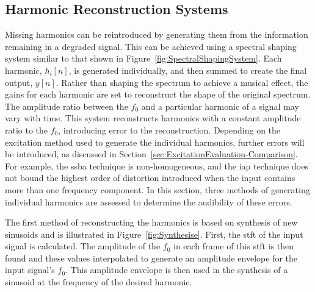 	\subsection{Harmonic Reconstruction Systems}
	\label{sec:PerceptualExperiments-Reconstruction-Systems}
		Missing harmonics can be reintroduced by generating them from the information remaining in a degraded
		signal. This can be achieved using a spectral shaping system similar to that shown in
		Figure~\ref{fig:SpectralShapingSystem}. Each harmonic, $h_{i}[n]$, is generated individually, and then
		summed to create the final output, $y[n]$. Rather than shaping the spectrum to achieve a musical effect,
		the gains for each harmonic are set to reconstruct the shape of the original spectrum. The amplitude ratio
		between the $f_{0}$ and a particular harmonic of a signal may vary with time. This system reconstructs
		harmonics with a constant amplitude ratio to the $f_{0}$, introducing error to the reconstruction.
		Depending on the excitation method used to generate the individual harmonics, further errors will be
		introduced, as discussed in Section~\ref{sec:ExcitationEvaluation-Comparison}. For example, the
		\acrshort{ssba} technique is non-homogeneous, and the \acrshort{iap} technique does not bound the highest
		order of distortion introduced when the input contains more than one frequency component. In this section,
		three methods of generating individual harmonics are assessed to determine the audibility of these errors.

		The first method of reconstructing the harmonics is based on synthesis of new sinusoids and is illustrated
		in Figure~\ref{fig:Synthesise}. First, the \acrshort{stft} of the input signal is calculated. The amplitude
		of the $f_{0}$ in each frame of this \acrshort{stft} is then found and these values interpolated to
		generate an amplitude envelope for the input signal's $f_{0}$. This amplitude envelope is then used in the
		synthesis of a sinusoid at the frequency of the desired harmonic.

